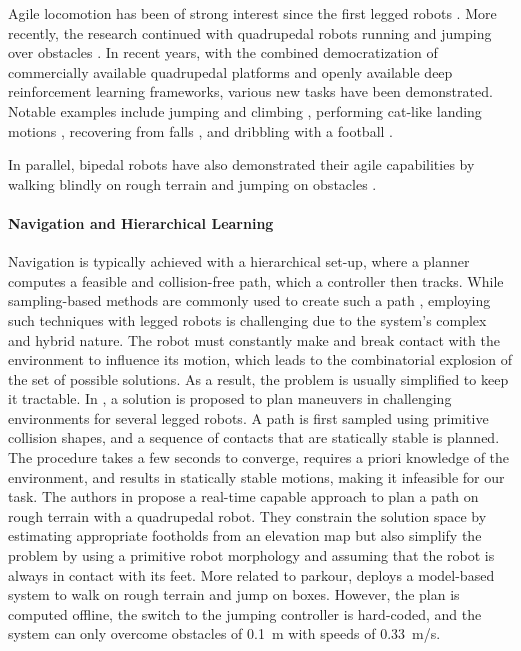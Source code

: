 \documentclass[conference]{IEEEtran}
\begin{document}
Agile locomotion has been of strong interest since the first legged robots \cite{raibert1986legged}. More recently, the research continued with quadrupedal robots running \cite{kim2019loco} and jumping over obstacles \cite{park2021jumping, nguyen2019Jumping}. In recent years, with the combined democratization of commercially available quadrupedal platforms and openly available deep reinforcement learning frameworks, various new tasks have been demonstrated. Notable examples include jumping and climbing \cite{rudinAdvancedSkills}, performing cat-like landing motions \cite{rudin2021cat, jeon2021cat}, recovering from falls \cite{hwangbo2019learning, ma2023almarecovery}, and dribbling with a football \cite{bohez2022imitate, ji2023dribblebot}.

In parallel, bipedal robots have also demonstrated their agile capabilities by walking blindly on rough terrain \cite{siekmann2021cassieblind} and jumping on obstacles \cite{li2023cassiejump}.

\paragraph{Navigation and Hierarchical Learning}
Navigation is typically achieved with a hierarchical set-up, where a planner computes a feasible and collision-free path, which a controller then tracks.
While sampling-based methods are commonly used to create such a path \cite{karaman2011RRT}, employing such techniques with legged robots is challenging due to the system's complex and hybrid nature. The robot must constantly make and break contact with the environment to influence its motion, which leads to the combinatorial explosion of the set of possible solutions. As a result, the problem is usually simplified to keep it tractable. In \cite{Tonneau2018Planning}, a solution is proposed to plan maneuvers in challenging environments for several legged robots. A path is first sampled using primitive collision shapes, and a sequence of contacts that are statically stable is planned. The procedure takes a few seconds to converge, requires a priori knowledge of the environment, and results in statically stable motions, making it infeasible for our task. The authors in \cite{wellhausen2021Nav} propose a real-time capable approach to plan a path on rough terrain with a quadrupedal robot. They constrain the solution space by estimating appropriate footholds from an elevation map but also simplify the problem by using a primitive robot morphology and assuming that the robot is always in contact with its feet. 
More related to parkour, \cite{kim2020loco} deploys a model-based system to walk on rough terrain and jump on boxes. However, the plan is computed offline, the switch to the jumping controller is hard-coded, and the system can only overcome obstacles of \SI{0.1}{\meter} with speeds of \SI{0.33}{\meter/\second}.
\end{document}
